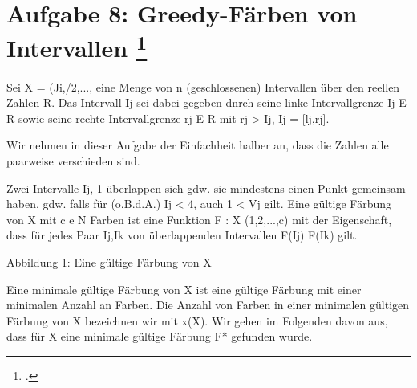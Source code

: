\documentclass{lehramt-informatik-aufgabe}
\begin{document}

\section{Aufgabe 8: Greedy-Färben von Intervallen
\footcite[Thema 1 Aufgabe 8]{examen:66115:2017:09}}

Sei X = (Ji,/2,..., eine Menge von n (geschlossenen) Intervallen über
den reellen Zahlen R. Das Intervall Ij sei dabei gegeben dnrch seine
linke Intervallgrenze Ij E R sowie seine rechte Intervallgrenze rj E R
mit rj > Ij, \dh Ij = [lj,rj].

Wir nehmen in dieser Aufgabe der Einfachheit halber an, dass die Zahlen
alle paarweise verschieden sind.

Zwei Intervalle Ij, 1 überlappen sich gdw. sie mindestens einen Punkt
gemeinsam haben, \dh gdw. falls für (o.B.d.A.) Ij < 4, auch 1 < Vj
gilt. Eine gültige Färbung von X mit c e N Farben ist eine Funktion F :
X  (1,2,...,c) mit der Eigenschaft, dass für jedes Paar Ij,Ik von
überlappenden Intervallen F(Ij)  F(Ik) gilt.

Abbildung 1: Eine gültige Färbung von X

Eine minimale gültige Färbung von X ist eine gültige Färbung mit einer
minimalen Anzahl an Farben. Die Anzahl von Farben in einer minimalen
gültigen Färbung von X bezeichnen wir mit x(X). Wir gehen im Folgenden
davon aus, dass für X eine minimale gültige Färbung F* gefunden wurde.
\end{document}
